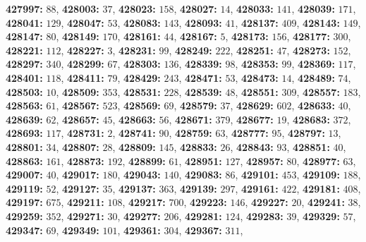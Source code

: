 \textsf{\bfseries 427997:} $88$, \textsf{\bfseries 428003:} $37$, \textsf{\bfseries 428023:} $158$, \textsf{\bfseries 428027:} $14$, \textsf{\bfseries 428033:} $141$, \textsf{\bfseries 428039:} $171$, \textsf{\bfseries 428041:} $129$, \textsf{\bfseries 428047:} $53$, \textsf{\bfseries 428083:} $143$, \textsf{\bfseries 428093:} $41$, \textsf{\bfseries 428137:} $409$, \textsf{\bfseries 428143:} $149$, \textsf{\bfseries 428147:} $80$, \textsf{\bfseries 428149:} $170$, \textsf{\bfseries 428161:} $44$, \textsf{\bfseries 428167:} $5$, \textsf{\bfseries 428173:} $156$, \textsf{\bfseries 428177:} $300$, \textsf{\bfseries 428221:} $112$, \textsf{\bfseries 428227:} $3$, \textsf{\bfseries 428231:} $99$, \textsf{\bfseries 428249:} $222$, \textsf{\bfseries 428251:} $47$, \textsf{\bfseries 428273:} $152$, \textsf{\bfseries 428297:} $340$, \textsf{\bfseries 428299:} $67$, \textsf{\bfseries 428303:} $136$, \textsf{\bfseries 428339:} $98$, \textsf{\bfseries 428353:} $99$, \textsf{\bfseries 428369:} $117$, \textsf{\bfseries 428401:} $118$, \textsf{\bfseries 428411:} $79$, \textsf{\bfseries 428429:} $243$, \textsf{\bfseries 428471:} $53$, \textsf{\bfseries 428473:} $14$, \textsf{\bfseries 428489:} $74$, \textsf{\bfseries 428503:} $10$, \textsf{\bfseries 428509:} $353$, \textsf{\bfseries 428531:} $228$, \textsf{\bfseries 428539:} $48$, \textsf{\bfseries 428551:} $309$, \textsf{\bfseries 428557:} $183$, \textsf{\bfseries 428563:} $61$, \textsf{\bfseries 428567:} $523$, \textsf{\bfseries 428569:} $69$, \textsf{\bfseries 428579:} $37$, \textsf{\bfseries 428629:} $602$, \textsf{\bfseries 428633:} $40$, \textsf{\bfseries 428639:} $62$, \textsf{\bfseries 428657:} $45$, \textsf{\bfseries 428663:} $56$, \textsf{\bfseries 428671:} $379$, \textsf{\bfseries 428677:} $19$, \textsf{\bfseries 428683:} $372$, \textsf{\bfseries 428693:} $117$, \textsf{\bfseries 428731:} $2$, \textsf{\bfseries 428741:} $90$, \textsf{\bfseries 428759:} $63$, \textsf{\bfseries 428777:} $95$, \textsf{\bfseries 428797:} $13$, \textsf{\bfseries 428801:} $34$, \textsf{\bfseries 428807:} $28$, \textsf{\bfseries 428809:} $145$, \textsf{\bfseries 428833:} $26$, \textsf{\bfseries 428843:} $93$, \textsf{\bfseries 428851:} $40$, \textsf{\bfseries 428863:} $161$, \textsf{\bfseries 428873:} $192$, \textsf{\bfseries 428899:} $61$, \textsf{\bfseries 428951:} $127$, \textsf{\bfseries 428957:} $80$, \textsf{\bfseries 428977:} $63$, \textsf{\bfseries 429007:} $40$, \textsf{\bfseries 429017:} $180$, \textsf{\bfseries 429043:} $140$, \textsf{\bfseries 429083:} $86$, \textsf{\bfseries 429101:} $453$, \textsf{\bfseries 429109:} $188$, \textsf{\bfseries 429119:} $52$, \textsf{\bfseries 429127:} $35$, \textsf{\bfseries 429137:} $363$, \textsf{\bfseries 429139:} $297$, \textsf{\bfseries 429161:} $422$, \textsf{\bfseries 429181:} $408$, \textsf{\bfseries 429197:} $675$, \textsf{\bfseries 429211:} $108$, \textsf{\bfseries 429217:} $700$, \textsf{\bfseries 429223:} $146$, \textsf{\bfseries 429227:} $20$, \textsf{\bfseries 429241:} $38$, \textsf{\bfseries 429259:} $352$, \textsf{\bfseries 429271:} $30$, \textsf{\bfseries 429277:} $206$, \textsf{\bfseries 429281:} $124$, \textsf{\bfseries 429283:} $39$, \textsf{\bfseries 429329:} $57$, \textsf{\bfseries 429347:} $69$, \textsf{\bfseries 429349:} $101$, \textsf{\bfseries 429361:} $304$, \textsf{\bfseries 429367:} $311$, 
